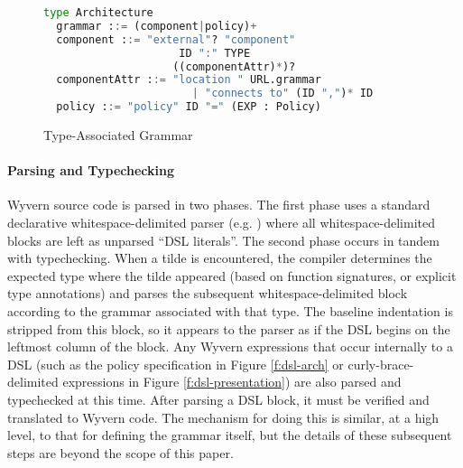 \begin{figure}
  \centering\small
  \begin{lstlisting}[language=Python,morekeywords={type,grammar,where,ID,TYPE,EXP}]
type Architecture
  grammar ::= (component|policy)+ 
  component ::= "external"? "component" 
                     ID ":" TYPE 
                    ((componentAttr)*)?
  componentAttr ::= "location " URL.grammar
                       | "connects to" (ID ",")* ID
  policy ::= "policy" ID "=" (EXP : Policy)
  \end{lstlisting}
  \caption{Type-Associated Grammar}
  \label{f:dsl-if}
\end{figure}

%
%
%
\paragraph{Parsing and Typechecking}
Wyvern source code is parsed in two phases. The first phase uses a standard declarative whitespace-delimited parser (e.g. \cite{rule2013principled}) where all whitespace-delimited blocks are left as unparsed ``DSL literals''. The second phase occurs in tandem with typechecking. When a tilde is encountered, the compiler determines the expected type where the tilde appeared (based on function signatures, or explicit type annotations) and parses the subsequent whitespace-delimited block according to the grammar associated with that type. The baseline indentation is stripped from this block, so it appears to the parser as if the DSL begins on the leftmost column of the block. Any Wyvern expressions that occur internally to a DSL (such as the policy specification in Figure \ref{f:dsl-arch} or curly-brace-delimited expressions in Figure \ref{f:dsl-presentation}) are also parsed and typechecked at this time. After parsing a DSL block, it must be verified and translated to Wyvern code. The mechanism for doing this is similar, at a high level, to that for defining the grammar itself, but the details of these subsequent steps are beyond the scope of this paper.

